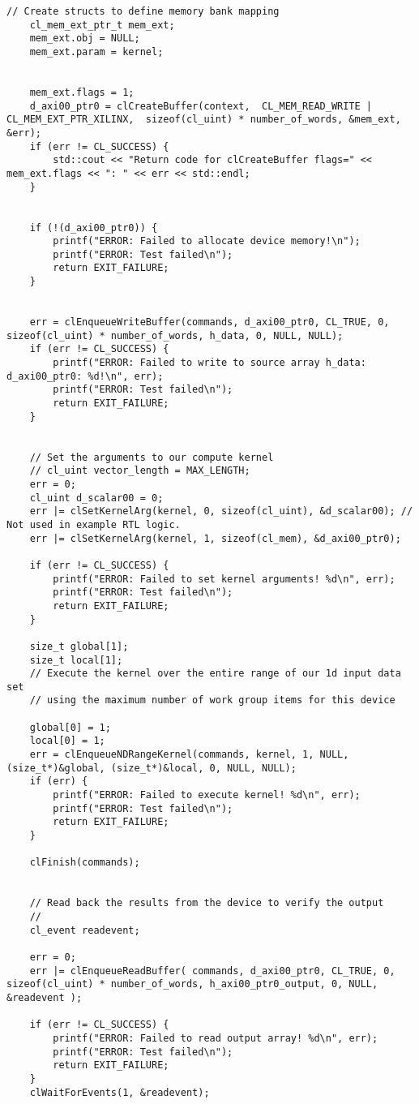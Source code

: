 \begin{lstlisting}[label=lst:code_1,caption=Содержимое файла host\_example.cpp]
	// Create structs to define memory bank mapping
	cl_mem_ext_ptr_t mem_ext;
	mem_ext.obj = NULL;
	mem_ext.param = kernel;
	
	
	mem_ext.flags = 1;
	d_axi00_ptr0 = clCreateBuffer(context,  CL_MEM_READ_WRITE | CL_MEM_EXT_PTR_XILINX,  sizeof(cl_uint) * number_of_words, &mem_ext, &err);
	if (err != CL_SUCCESS) {
		std::cout << "Return code for clCreateBuffer flags=" << mem_ext.flags << ": " << err << std::endl;
	}
	
	
	if (!(d_axi00_ptr0)) {
		printf("ERROR: Failed to allocate device memory!\n");
		printf("ERROR: Test failed\n");
		return EXIT_FAILURE;
	}
	
	
	err = clEnqueueWriteBuffer(commands, d_axi00_ptr0, CL_TRUE, 0, sizeof(cl_uint) * number_of_words, h_data, 0, NULL, NULL);
	if (err != CL_SUCCESS) {
		printf("ERROR: Failed to write to source array h_data: d_axi00_ptr0: %d!\n", err);
		printf("ERROR: Test failed\n");
		return EXIT_FAILURE;
	}
	
	
	// Set the arguments to our compute kernel
	// cl_uint vector_length = MAX_LENGTH;
	err = 0;
	cl_uint d_scalar00 = 0;
	err |= clSetKernelArg(kernel, 0, sizeof(cl_uint), &d_scalar00); // Not used in example RTL logic.
	err |= clSetKernelArg(kernel, 1, sizeof(cl_mem), &d_axi00_ptr0);
	
	if (err != CL_SUCCESS) {
		printf("ERROR: Failed to set kernel arguments! %d\n", err);
		printf("ERROR: Test failed\n");
		return EXIT_FAILURE;
	}
	
	size_t global[1];
	size_t local[1];
	// Execute the kernel over the entire range of our 1d input data set
	// using the maximum number of work group items for this device
	
	global[0] = 1;
	local[0] = 1;
	err = clEnqueueNDRangeKernel(commands, kernel, 1, NULL, (size_t*)&global, (size_t*)&local, 0, NULL, NULL);
	if (err) {
		printf("ERROR: Failed to execute kernel! %d\n", err);
		printf("ERROR: Test failed\n");
		return EXIT_FAILURE;
	}
	
	clFinish(commands);
	
	
	// Read back the results from the device to verify the output
	//
	cl_event readevent;
	
	err = 0;
	err |= clEnqueueReadBuffer( commands, d_axi00_ptr0, CL_TRUE, 0, sizeof(cl_uint) * number_of_words, h_axi00_ptr0_output, 0, NULL, &readevent );

	if (err != CL_SUCCESS) {
		printf("ERROR: Failed to read output array! %d\n", err);
		printf("ERROR: Test failed\n");
		return EXIT_FAILURE;
	}
	clWaitForEvents(1, &readevent);
	

\end{lstlisting}

